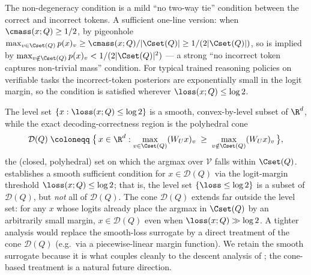 \begin{remark}\label{rem:logit_margin_nondegen_typical}
The non-degeneracy condition  is a mild
``no two-way tie'' condition between the correct and incorrect tokens.
A sufficient one-line version: when $\cmass(x; Q) \ge 1/2$, by
pigeonhole $\max_{v \in \Cset(Q)} p(x)_v \ge \cmass(x; Q)/|\Cset(Q)| \ge 1/(2 |\Cset(Q)|)$,
so  is implied by
$\max_{v \notin \Cset(Q)} p(x)_v < 1/(2 |\Cset(Q)|^2)$ --- a strong
``no incorrect token captures non-trivial mass'' condition. For typical
trained reasoning policies on verifiable tasks the incorrect-token
posteriors are exponentially small in the logit margin, so the
condition is satisfied wherever $\loss(x; Q) \le \log 2$.
\end{remark}

\begin{remark}\label{rem:sufficient_not_exact}
The level set $\{x : \loss(x; Q) \le \log 2\}$ is a smooth, convex-by-level
subset of $\R^d$, while the exact decoding-correctness region is the
polyhedral cone
\begin{align*}
   \mathcal D(Q) \;\coloneqq\; \bigl\{\, x \in \R^d :
   \max_{v \in \Cset(Q)} (W_U x)_v
   \;\ge\;
   \max_{v \notin \Cset(Q)} (W_U x)_v \,\bigr\},
\end{align*}
the (closed, polyhedral) set on which the argmax over $\mathcal V$ falls
within $\Cset(Q)$.  establishes a smooth
sufficient condition for $x \in \mathcal D(Q)$ via the logit-margin
threshold $\loss(x; Q) \le \log 2$; that is, the level set
$\{\loss \le \log 2\}$ is a subset of $\mathcal D(Q)$, but \emph{not}
all of $\mathcal D(Q)$. The cone $\mathcal D(Q)$ extends far outside
the level set: for any $x$ whose logits already place the argmax in
$\Cset(Q)$ by an arbitrarily small margin, $x \in \mathcal D(Q)$ even
when $\loss(x; Q) \gg \log 2$. A tighter analysis would replace the
smooth-loss surrogate by a direct treatment of the cone $\mathcal D(Q)$
(e.g.\ via a piecewise-linear margin function). We retain the smooth
surrogate because it is what couples cleanly to the descent analysis of
; the cone-based treatment
is a natural future direction.
\end{remark}
